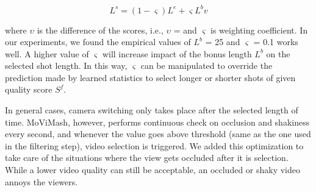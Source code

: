 \documentclass{new}
\begin{document}
\begin{equation}
    L^s = (1 - \varsigma)L^e + \varsigma L^bv
\end{equation}

where $\upsilon$ is the difference of the scores, i.e., $\upsilon$ =
and $\varsigma$ is
weighting coefficient. In our experiments, we found the empirical
values of $L^b$ = 25 and $\varsigma$ = 0.1 works well. A higher value of
 $\varsigma$ will increase impact of the bonus length $L^b$ on the selected shot
length. In this way, $\varsigma$ can be manipulated to override the prediction
made by learned statistics to select longer or shorter shots of given
quality score $S^f$.

In general cases, camera switching only takes place after the selected length of time. MoViMash, however, performs continuous
check on occlusion and shakiness every second, and whenever the
value goes above threshold (same as the one used in the filtering
step), video selection is triggered. We added this optimization to
take care of the situations where the view gets occluded after it is
selection. While a lower video quality can still be acceptable, an
occluded or shaky video annoys the viewers.
\end{document}
